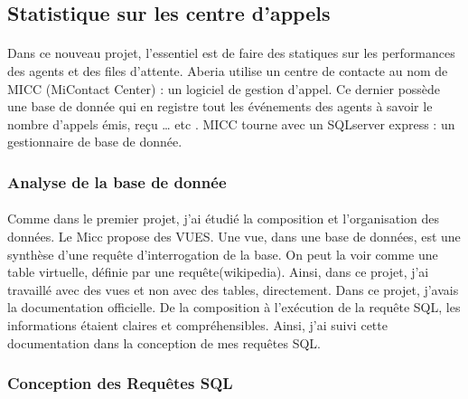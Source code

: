 \documentclass[a4paper,12pt]{report}
\begin{document}
\subsection{Statistique sur les centre d’appels}

\paragraph*{}
               Dans ce nouveau projet, l’essentiel est de faire des statiques sur les performances des agents et des files d’attente.\newline  
               Aberia utilise un centre de contacte au nom de MICC (MiContact Center) : un logiciel de gestion d’appel. Ce dernier possède une base de donnée qui en registre tout les événements des agents à savoir le nombre d’appels émis, reçu … etc .\newline 
               MICC tourne avec un SQLserver express : un gestionnaire de base de donnée.
       
\subsubsection{Analyse de la base de donnée}

\paragraph*{}

                   Comme dans le premier projet,  j’ai étudié la composition et l’organisation des données. Le Micc propose des VUES. Une vue, dans une base de données, est une synthèse d'une requête d'interrogation de la base. On peut la voir comme une table virtuelle, définie par une requête(wikipedia). Ainsi, dans ce projet, j’ai travaillé avec des vues et non avec des tables, directement.\newline
                   Dans ce projet, j’avais la documentation officielle. De la composition à l'exécution de la requête SQL, les informations étaient claires et compréhensibles. Ainsi, j’ai suivi cette documentation dans la conception de mes requêtes SQL. 

\subsubsection{Conception des Requêtes SQL}

\paragraph*{}
\end{document}
